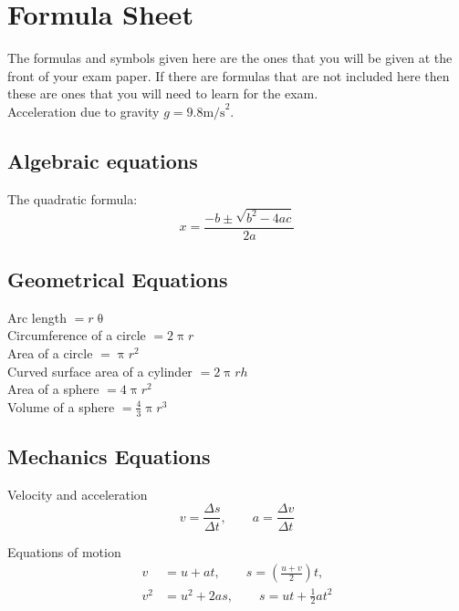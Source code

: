 
\chapter{Formula Sheet}
The formulas and symbols given here are the ones that you will be given at the front of your exam paper. If there are formulas that are not included here then these are ones that you will need to learn for the exam.\\

Acceleration due to gravity $g=9.8\text{m/s}^{2}$.\\

\section*{Algebraic equations}

The quadratic formula:
\begin{equation*}
x=\frac{-b\pm\sqrt{b^{2}-4ac}}{2a}
\end{equation*}

\section*{Geometrical Equations}

Arc length $=r\uptheta$\\

Circumference of a circle $=2\uppi r$\\

Area of a circle $=\uppi r^{2}$\\

Curved surface area of a cylinder $=2\uppi r h$\\

Area of a sphere $=4\uppi r^{2}$\\

Volume of a sphere $=\frac{4}{3}\uppi r^{3}$\\

\section*{Mechanics Equations}
Velocity and acceleration
\begin{equation*}
v=\frac{\Delta s}{\Delta t}, \qquad a=\frac{\Delta v}{\Delta t}
\end{equation*}

Equations of motion
\begin{align*}
v&=u+at, \qquad s=\left(\frac{u+v}{2}\right)t,\\
v^{2}&=u^{2}+2as, \qquad s=ut+\frac{1}{2}at^{2}
\end{align*}

